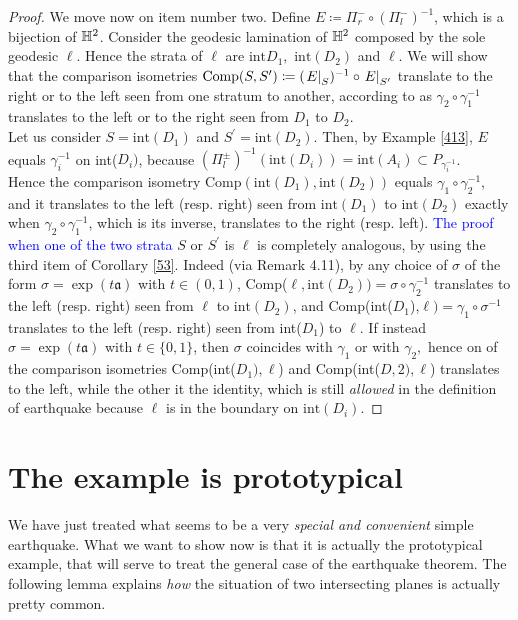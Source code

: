 \begin{proof}
  We move now on item number two. Define $E\coloneqq\Pi_r^-\circ(\Pi_l^-)^{-1}$, which is a bijection of $\mathbb{H}^2$. Consider the geodesic lamination of $\mathbb{H}^2$ composed by the sole geodesic $\ell.$ Hence the strata of $\ell$ are $\text{int}{D_1},$ $\text{int}(D_2)$ and $\ell$. We will show that the comparison isometries $\text{Comp}(S,S^{\prime})\coloneqq(\left.E\right|_{S})^{-1}\circ\left.E\right|_{S^{\prime}}$ translate to the right or to the left seen from one stratum to another, according to as $ \gamma_2\circ\gamma_1^{-1}$ translates to the left or to the right seen from $D_1$ to $D_2$.\\
  Let us consider $S=\text{int}(D_1)$ and $S^{\prime}=\text{int}(D_2)$. Then, by Example \ref{413}, $E$ equals $\gamma_i^{-1}$ on int($D_i)$, because $(\Pi_l^\pm)^{-1}(\text{int}(D_i))=\text{int}(A_i)\subset P_{\gamma_i^{-1}}$. \\
  Hence the comparison isometry $\text{Comp}(\text{int}(D_1),\text{int}(D_2))$ equals $\gamma_1\circ\gamma_2^{-1}$, and it translates to the left (resp. right) seen from $\text{int}(D_1)$ to $\text{int}(D_2)$ exactly when $\gamma_2\circ\gamma_1^{-1}$, which is its inverse, translates to the right (resp. left).  
  \textcolor{blue}{The proof when one of the two strata} $S$ or $S^{\prime}$ is $\ell$ is completely analogous, by using the third item of Corollary \ref{53}. Indeed (via Remark 4.11), by any choice of $\sigma$ of the form $\sigma=\exp(t\mathfrak{a})$ with $t\in(0,1)$, Comp($\ell,\text{int}(D_2))=\sigma\circ\gamma_2^{-1}$ translates to the left (resp. right) seen from $\ell$ to $\text{int}(D_2)$, and Comp(int($D_1$),$\ell)=\gamma_1\circ\sigma^{-1}$ translates to the left (resp. right) seen from int($D_1$) to $\ell.$ If instead $\sigma=\exp(t\mathfrak{a})$ with $t\in\{0,1\}$, then $\sigma$ coincides with $\gamma_1$ or with $\gamma_2,$ hence on of the comparison isometries Comp(int($D_1),\ell$) and Comp(int($D,2),\ell$) translates to the left, while the other it the identity, which is still \textit{allowed} in the definition of earthquake because $\ell$ is in the boundary on $\text{int}(D_i)$.
 \end{proof}

\section{The example is prototypical} We have just treated what seems to be a very \textit{special and convenient} simple earthquake. What we want to show now is that it is actually the prototypical example, that will serve to treat the general case of the earthquake theorem. The following lemma explains \textit{how} the situation of two intersecting planes is actually pretty common. 


